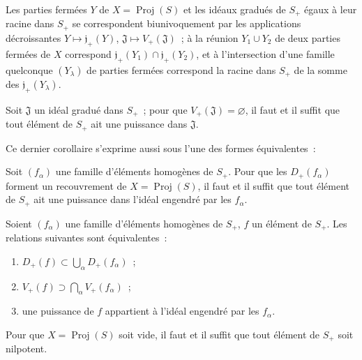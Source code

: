 \begin{corollary}[2.3.12]
\label{II.2.3.12-fr}
Les parties fermées $Y$ de $X=\operatorname{Proj}(S)$ et les idéaux gradués
de $S_+$ égaux à leur racine dans $S_+$ se correspondent biunivoquement par
les applications décroissantes
$Y\longmapsto\mathfrak{j}_+(Y)$, $\mathfrak{J}\longmapsto
V_+(\mathfrak{J})$~; à la réunion $Y_1\cup Y_2$ de deux parties fermées de
$X$ correspond
$\mathfrak{j}_+(Y_1)\cap\mathfrak{j}_+(Y_2)$, et à l'intersection d'une
famille quelconque $(Y_\lambda)$ de parties fermées correspond la racine
dans $S_+$ de la somme des $\mathfrak{j}_+(Y_\lambda)$.
\end{corollary}

\begin{corollary}[2.3.13]
\label{II.2.3.13-fr}
Soit $\mathfrak{J}$ un idéal gradué dans $S_+$~; pour que
$V_+(\mathfrak{J})=\varnothing$, il faut et il suffit que tout élément de
$S_+$ ait une puissance dans $\mathfrak{J}$.
\end{corollary}

Ce dernier corollaire s'exprime aussi sous l'une des formes équivalentes~:

\begin{corollary}[2.3.14]
\label{II.2.3.14-fr}
Soit $(f_\alpha)$ une famille d'éléments homogènes de $S_+$. Pour que les
$D_+(f_\alpha)$ forment un recouvrement de
$X=\operatorname{Proj}(S)$, il faut et il suffit que tout élément de $S_+$
ait une puissance dans l'idéal engendré par les $f_\alpha$.
\end{corollary}

\begin{corollary}[2.3.15]
\label{II.2.3.15-fr}
Soient $(f_\alpha)$ une famille d'éléments homogènes de $S_+$, $f$ un
élément de $S_+$. Les relations suivantes sont équivalentes~:
\begin{enumerate}
  \item[\rm a)] $D_+(f)\subset\bigcup_\alpha D_+(f_\alpha)$~;
  \item[\rm b)] $V_+(f)\supset\bigcap_\alpha V_+(f_\alpha)$~;
  \item[\rm c)] une puissance de $f$ appartient à l'idéal engendré par les
    $f_\alpha$.
\end{enumerate}
\end{corollary}

\begin{corollary}[2.3.16]
\label{II.2.3.16-fr}
Pour que $X=\operatorname{Proj}(S)$ soit vide, il faut et il suffit que tout
élément de $S_+$ soit nilpotent.
\end{corollary}

